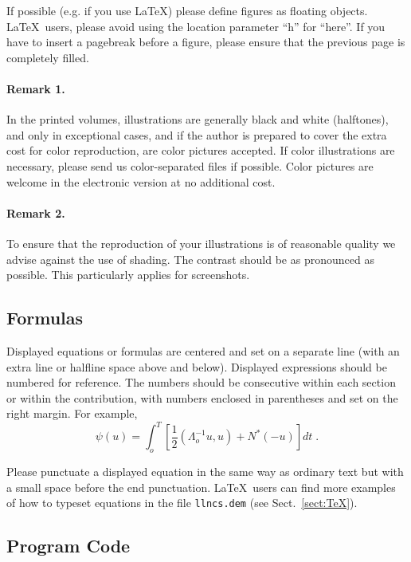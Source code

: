 \documentclass[runningheads]{llncs}
\begin{document}
If possible (e.g. if you use \LaTeX) please define figures as floating
objects. \LaTeX\ users, please avoid using the location
parameter ``h'' for ``here''. If you have to insert a pagebreak before a
figure, please ensure that the previous page is completely filled.


\paragraph{Remark 1.}

In the printed volumes, illustrations are generally black and white
(halftones), and only in exceptional cases, and if the author is
prepared
to cover the extra cost for color reproduction, are color pictures
accepted. If color illustrations are necessary, please send us
color-separated files if possible.
Color pictures are welcome in the electronic version at no additional
cost.

\paragraph{Remark 2.}

To ensure that the reproduction of your illustrations is of reasonable
quality we advise against the use of shading. The contrast should be as
pronounced as possible. This particularly applies for screenshots.


\subsection{Formulas}

Displayed equations or formulas are centered and set on a separate
line (with an extra line or halfline space above and below). Displayed
expressions should be numbered for reference. The numbers should be
consecutive within each section or within the contribution,
with numbers enclosed in parentheses and set on the right margin.
For example,
\begin{equation}
  \psi (u) = \int_{o}^{T} \left[\frac{1}{2}
  \left(\Lambda_{o}^{-1} u,u\right) + N^{\ast} (-u)\right] dt \;  .
\end{equation}

Please punctuate a displayed equation in the same way as ordinary
text but with a small space before the end punctuation.
\LaTeX\ users can find more examples of how to typeset equations in the
file \verb+llncs.dem+ (see Sect.~\ref{sect:TeX}).


\subsection{Program Code}
\end{document}
